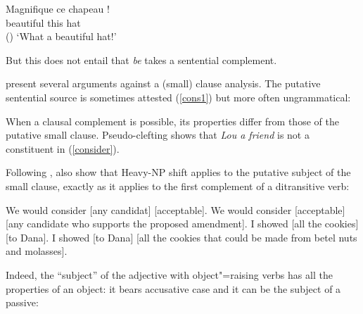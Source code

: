 \documentclass[output=paper
	        ,collection
	        ,collectionchapter
 	        ,biblatex
                ,babelshorthands
                ,newtxmath
                ,draftmode
                ,colorlinks, citecolor=brown
]{langscibook}
\begin{document}
\ea
\gll Magnifique ce chapeau !\\
     beautiful this hat\\\hfill{()}
\glt `What a beautiful hat!'
\z

\noindent
But this does not entail that \emph{be} takes a sentential complement. 




\citet[Chapter~3]{PollardandSag1994} present several arguments against a (small) clause analysis. The putative sentential source is sometimes attested (\ref{cons1}) but more often ungrammatical:

	
\eal
{}
\zl

	
When a clausal complement is possible, its properties differ from those of the putative small clause. Pseudo-clefting shows that \textit{Lou a friend} is not a constituent in (\ref{consider}).

\eal
{}
\zl

Following \citet{Bresnan1982}\addpages, \citet[113]{PollardandSag1994} also show that Heavy-NP shift
applies to the putative subject of the small clause, exactly as it applies to the first complement
of a ditransitive verb:

\eal
\ex We would consider [any candidat] [acceptable].
\ex We would consider [acceptable]  [any candidate who supports the proposed amendment].
\ex I showed [all the cookies] [to Dana].
\ex I showed [to Dana]  [all the cookies that could be made from betel nuts and molasses].  
\zl

Indeed, the ``subject'' of the adjective with object"=raising verbs has all the properties of an
object: it bears accusative case and it can be the subject of a passive:
\end{document}
